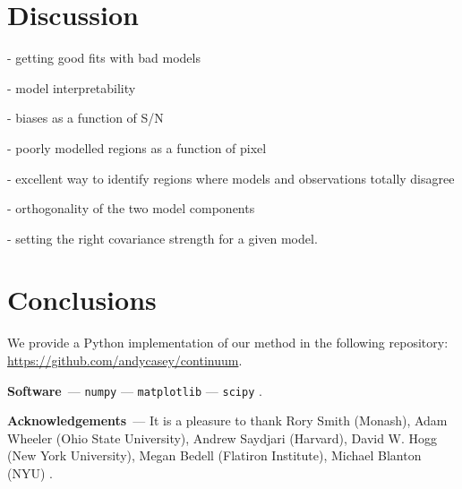 \documentclass[modern]{aastex631}
\renewcommand{\paragraph}[1]{\medskip\par\noindent\textbf{#1}~---}
\begin{document}
\section{Discussion}\label{sec:discussion}

- getting good fits with bad models

- model interpretability

- biases as a function of S/N

- poorly modelled regions as a function of pixel

- excellent way to identify regions where models and observations totally disagree

- orthogonality of the two model components

- setting the right covariance strength for a given model.


\section{Conclusions}
\label{sec:conclusions}



\noindent{}We provide a Python implementation of our method in the following repository: \url{https://github.com/andycasey/continuum}. 

\paragraph{Software}
\texttt{numpy} \citep{numpy} ---
\texttt{matplotlib} \citep{matplotlib} ---
\texttt{scipy} \citep{scipy}.

\paragraph{Acknowledgements}
It is a pleasure to thank
    Rory Smith (Monash),
    Adam Wheeler (Ohio State University),
    Andrew Saydjari (Harvard),
    David W. Hogg (New York University),
    Megan Bedell (Flatiron Institute),
    Michael Blanton (NYU)
.

%
\end{document}
